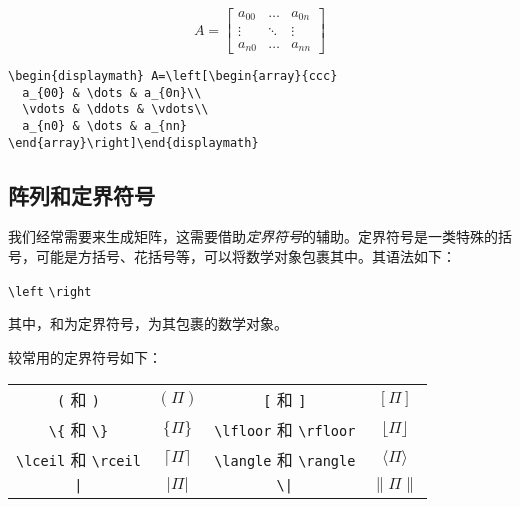 \begin{codelist}[3.15]{
  \begin{displaymath} A=\left[\begin{array}{ccc}
    a_{00} & \dots & a_{0n}\\
    \vdots & \ddots & \vdots\\
    a_{n0} & \dots & a_{nn}
  \end{array}\right]\end{displaymath}
}
\begin{verbatim}
\begin{displaymath} A=\left[\begin{array}{ccc}
  a_{00} & \dots & a_{0n}\\
  \vdots & \ddots & \vdots\\
  a_{n0} & \dots & a_{nn}
\end{array}\right]\end{displaymath}\end{verbatim}
\end{codelist}

\subsection{阵列和定界符号}

我们经常需要来生成矩阵，这需要借助\emph{定界符号}的辅助。定界符号是一类特殊的括号，可能是方括号、花括号等，可以将数学对象包裹其中。其语法如下：

\begin{dmd}
\verb|\left|  \verb|\right|
\end{dmd}

其中，和为定界符号，为其包裹的数学对象。

较常用的定界符号如下：

\begin{center}
  \begin{tabular}{cccc}
    \verb+(+ 和 \verb+)+               & $(\Pi)$             &
    \verb+[+ 和 \verb+]+               & $[\Pi]$             \\
    \verb+\{+ 和 \verb+\}+             & $\{\Pi\}$           &
    \verb|\lfloor| 和 \verb|\rfloor| & $\lfloor\Pi\rfloor$ \\
    \verb|\lceil| 和 \verb|\rceil|   & $\lceil\Pi\rceil$   &
    \verb|\langle| 和 \verb|\rangle| & $\langle\Pi\rangle$  \\
    \verb+|+                           & $|\Pi|$             &
    \verb+\|+                         & $\|\Pi\|$           
  \end{tabular}
\end{center}

